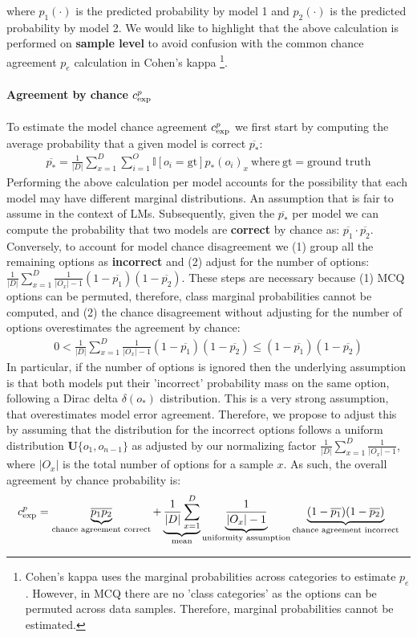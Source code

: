 where $p_1(\cdot)$ is the predicted probability by model 1 and $p_2(\cdot)$ is the predicted probability by model 2. We would like to highlight that the above calculation is performed on \textbf{sample level} to avoid confusion with the common chance agreement $p_e$ calculation in Cohen's kappa \footnote{Cohen's kappa uses the marginal probabilities across categories to estimate $p_e$. However, in MCQ there are no 'class categories' as the options can be permuted across data samples. Therefore, marginal probabilities cannot be estimated.}.  

\paragraph{Agreement by chance $c_{\text{exp}}^{p}$} To estimate the model chance agreement $c_{\text{exp}}^{p}$ we first start by computing the average probability that a given model is correct $\overline{p_*}$:
\begin{align}
    \overline{p_*} = \frac{1}{|D|} \sum_{x=1}^{D}\sum_{i=1}^O \mathbb{I}[o_i=\text{gt}]p_*(o_i)_x \: \text{where} \: \text{gt} = \text{ground truth}
\end{align}
Performing the above calculation per model accounts for the possibility that each model may have different marginal distributions. An assumption that is fair to assume in the context of LMs. Subsequently, given the $\overline{p_*}$ per model we can compute the probability that two models are \textbf{correct} by chance as: $\overline{p_1} \cdot \overline{p_2}$. Conversely, to account for model chance disagreement we (1) group all the remaining options as \textbf{incorrect} and (2) adjust for the number of options: $\frac{1}{|D|}\sum_{x=1}^D\frac{1}{|O_x|-1}(1-\overline{p_1})(1-\overline{p_2})$. These steps are necessary because (1) MCQ options can be permuted, therefore, class marginal probabilities cannot be computed, and (2) the chance disagreement without adjusting for the number of options overestimates the agreement by chance:
\begin{align}
    0 < \frac{1}{|D|}\sum_{x=1}^D\frac{1}{|O_x|-1}(1-\overline{p_1})(1-\overline{p_2}) \leq (1-\overline{p_1})(1-\overline{p_2})  
\end{align}
In particular, if the number of options is ignored then the underlying assumption is that both models put their 'incorrect' probability mass on the same option, following a Dirac delta $\delta(o_*)$ distribution. This is a very strong assumption, that overestimates model error agreement. Therefore, we propose to adjust this by assuming that the distribution for the incorrect options follows a uniform distribution $\mathbf{U}\{o_1,o_{n-1}\}$ as adjusted by our normalizing factor $\frac{1}{|D|}\sum_{x=1}^D\frac{1}{|O_x|-1}$, where $|O_x|$ is the total number of options for a sample $x$. As such, the overall agreement by chance probability is:
\begin{align}
    c_{\text{exp}}^{p} = \underbrace{\overline{p_1} \overline{p_2}}_{\text{chance agreement correct}} + \underbrace{\frac{1}{|D|} \sum_{x=1}^{D}}_{\text{mean}} \underbrace{\frac{1}{|O_x|-1}}_{\substack{\text{uniformity assumption}}} \underbrace{(1 - \overline{p_1})(1 - \overline{p_2})}_{\text{chance agreement incorrect}} 
\end{align}

